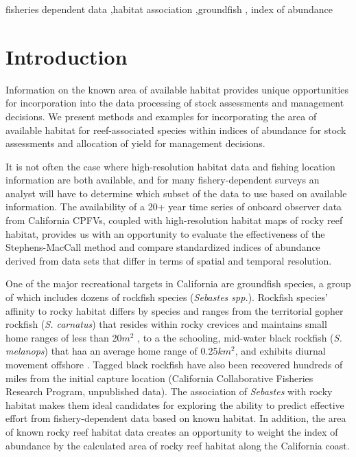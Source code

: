 \documentclass[
  12pt,
  authoryear,
  preprint,
  3p]{elsarticle}
\begin{document}
\begin{frontmatter}
\begin{keyword}
    fisheries dependent data \sep habitat
association \sep groundfish \sep 
    index of abundance
\end{keyword}
\end{frontmatter}\ifdefined\Shaded\renewenvironment{Shaded}{\begin{tcolorbox}[breakable, sharp corners, interior hidden, boxrule=0pt, borderline west={3pt}{0pt}{shadecolor}, frame hidden, enhanced]}{\end{tcolorbox}}\fi

\hypertarget{introduction}{%
\section{Introduction}\label{introduction}}

Information on the known area of available habitat provides unique
opportunities for incorporation into the data processing of stock
assessments and management decisions. We present methods and examples
for incorporating the area of available habitat for reef-associated
species within indices of abundance for stock assessments and allocation
of yield for management decisions.

It is not often the case where high-resolution habitat data and fishing
location information are both available, and for many fishery-dependent
surveys an analyst will have to determine which subset of the data to
use based on available information. The availability of a 20+ year time
series of onboard observer data from California CPFVs, coupled with
high-resolution habitat maps of rocky reef habitat, provides us with an
opportunity to evaluate the effectiveness of the Stephens-MacCall method
and compare standardized indices of abundance derived from data sets
that differ in terms of spatial and temporal resolution.

One of the major recreational targets in California are groundfish
species, a group of which includes dozens of rockfish species
(\emph{Sebastes spp.}). Rockfish species' affinity to rocky habitat
differs by species and ranges from the territorial gopher rockfish
(\emph{S. carnatus}) that resides within rocky crevices and maintains
small home ranges of less than 20\(m^2\) \citep{Larson:1980:TBB}, to a
the schooling, mid-water black rockfish (\emph{S. melanops}) that haa an
average home range of 0.25\(km^2\), and exhibits diurnal movement
offshore \citep{Green:2011:MSA}. Tagged black rockfish have also been
recovered hundreds of miles from the initial capture location
(California Collaborative Fisheries Research Program, unpublished data).
The association of \emph{Sebastes} with rocky habitat makes them ideal
candidates for exploring the ability to predict effective effort from
fishery-dependent data based on known habitat. In addition, the area of
known rocky reef habitat data creates an opportunity to weight the index
of abundance by the calculated area of rocky reef habitat along the
California coast.
\end{document}
